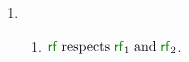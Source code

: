 \begin{figure}
\begin{multicols}{2}
\begin{enumerate}[topsep=0pt,label=(\textsc{i}\arabic*),ref=\textsc{i}\arabic*]
    \item[]
      \begin{enumerate}[leftmargin=0pt]
      \item \label{if-rf-extends}
        ${\rrfx}\rextends{\rrfx_1}{\rrfx_2}$.
      \end{enumerate}
    \end{enumerate}
  \end{multicols}
  \medskip



\end{figure}
